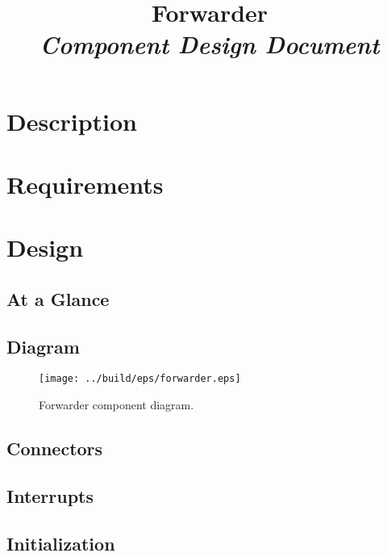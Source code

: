 



\title{\textbf{Forwarder} \\
\large\textit{Component Design Document}}
\date{}
\maketitle

\section{Description}


\section{Requirements}


\section{Design}

\subsection{At a Glance}


\subsection{Diagram}
\begin{figure}[H]
  \texttt{[image: ../build/eps/forwarder.eps]}
  \caption{Forwarder component diagram.}
\end{figure}

\subsection{Connectors}


\subsection{Interrupts}



\subsection{Initialization}


